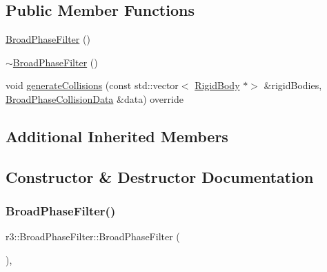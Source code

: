 \subsection*{Public Member Functions}
\begin{DoxyCompactItemize}
\item 
\mbox{\hyperlink{classr3_1_1_broad_phase_filter_afcdb0ed5acb941bf16e284cb0031fe2e}{Broad\+Phase\+Filter}} ()
\item 
\mbox{\hyperlink{classr3_1_1_broad_phase_filter_a3c28ac36ed06766b235efad77ff9fd5d}{$\sim$\+Broad\+Phase\+Filter}} ()
\item 
void \mbox{\hyperlink{classr3_1_1_broad_phase_filter_a16b87610362f670906ca7d9a3251815f}{generate\+Collisions}} (const std\+::vector$<$ \mbox{\hyperlink{classr3_1_1_rigid_body}{Rigid\+Body}} $\ast$$>$ \&rigid\+Bodies, \mbox{\hyperlink{classr3_1_1_broad_phase_collision_data}{Broad\+Phase\+Collision\+Data}} \&data) override
\end{DoxyCompactItemize}
\subsection*{Additional Inherited Members}


\subsection{Constructor \& Destructor Documentation}
\mbox{\label{classr3_1_1_broad_phase_filter_afcdb0ed5acb941bf16e284cb0031fe2e}} 
\subsubsection{\texorpdfstring{Broad\+Phase\+Filter()}{BroadPhaseFilter()}}
{\footnotesize\ttfamily r3\+::\+Broad\+Phase\+Filter\+::\+Broad\+Phase\+Filter (\begin{DoxyParamCaption}{ }\end{DoxyParamCaption})\hspace{0.3cm}{\ttfamily [explicit]}, {\ttfamily [default]}}

\mbox{\label{classr3_1_1_broad_phase_filter_a3c28ac36ed06766b235efad77ff9fd5d}} 
